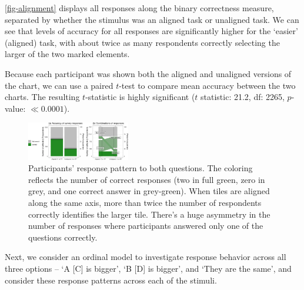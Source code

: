 \documentclass[
]{jds}
\begin{document}
\autoref{fig-alignment} displays all responses along the binary
correctness measure, separated by whether the stimulus was an aligned
task or unaligned task. We can see that levels of accuracy for all
responses are significantly higher for the `easier' (aligned) task, with
about twice as many respondents correctly selecting the larger of the
two marked elements.

Because each participant was shown both the aligned and unaligned
versions of the chart, we can use a paired \(t\)-test to compare mean
accuracy between the two charts. The resulting \(t\)-statistic is highly
significant (\(t\) statistic: 21.2, df: 2265, \(p\)-value:
\(\ll 0.0001\)).

\begin{figure}[hbt]

{\centering \includegraphics[width=0.4\textwidth,height=\textheight]{./figures/fig-alignment-1.png}

}

\caption{\label{fig-alignment}Participants' response pattern to both
questions. The coloring reflects the number of correct responses (two in
full green, zero in grey, and one correct answer in grey-green). When
tiles are aligned along the same axis, more than twice the number of
respondents correctly identifies the larger tile. There's a huge
asymmetry in the number of responses where participants answered only
one of the questions correctly.}

\end{figure}

Next, we consider an ordinal model to investigate response behavior
across all three options -- `A {[}C{]} is bigger', `B {[}D{]} is
bigger', and `They are the same', and consider these response patterns
across each of the stimuli.
\end{document}
